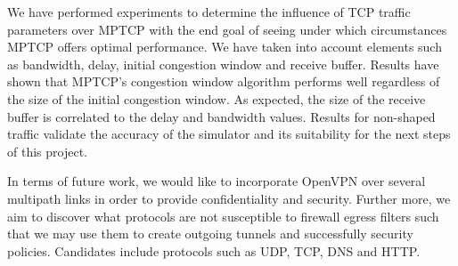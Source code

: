 
We have performed experiments to determine the influence of TCP traffic parameters over MPTCP with the end goal of seeing under which circumstances MPTCP offers optimal performance. We have taken into account elements such as bandwidth, delay, initial congestion window and receive buffer. Results have shown that MPTCP's congestion window algorithm performs well regardless of the size of the initial congestion window. As expected, the size of the receive buffer is correlated to the delay and bandwidth values. Results for non-shaped traffic validate the accuracy of the simulator and its suitability for the next steps of this project.

In terms of future work, we would like to incorporate OpenVPN over several multipath links in order to provide confidentiality and security. Further more, we aim to discover what protocols are not susceptible to firewall egress filters such that we may use them to create outgoing tunnels and successfully security policies. Candidates include protocols such as UDP, TCP, DNS and HTTP.
